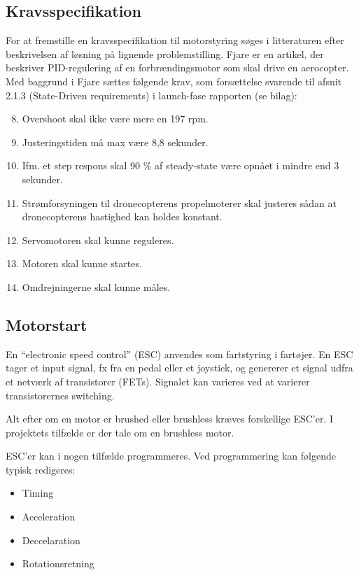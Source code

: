 
\subsection{Kravsspecifikation}
\label{sec:kravsspecifikation}
For at fremstille en kravsspecifikation til motorstyring søges i litteraturen efter beskrivelsen af løsning på lignende problemstilling. Fjare\autocite{pid1} er en artikel, der beskriver PID-regulering af en forbrændingsmotor som skal drive en aerocopter. Med baggrund i Fjare\autocite{pid1} sættes følgende krav, som forsættelse svarende til afsnit 2.1.3 (State-Driven requirements) i launch-fase rapporten (se bilag):
\begin{enumerate}[label=2.1.3.\arabic*]
  \setcounter{enumi}{7}
\item Overshoot skal ikke være mere en 197 rpm.
\item Justeringstiden må max være 8,8 sekunder.
\item Ifm. et step respons skal 90 \% af steady-state være opnået i mindre end 3 sekunder.
\item Strømforsyningen til dronecopterens propelmoterer skal justeres sådan at dronecopterens hastighed kan holdes konstant.%
\item Servomotoren skal kunne reguleres.
\item Motoren skal kunne startes.
\item Omdrejningerne skal kunne måles.
\end{enumerate}

\subsection{Motorstart}
\label{sec:esc}

En ``electronic speed control'' (ESC) anvendes som fartstyring i fartøjer. En ESC tager et input signal, fx fra en pedal eller et joystick, og genererer et signal udfra et netværk af transistorer (FETs). Signalet kan varieres ved at varierer transistorernes switching.

Alt efter om en motor er brushed eller brushless kræves forskellige ESC'er. I projektets tilfælde er der tale om en brushless motor. 

ESC'er kan i nogen tilfælde programmeres. Ved programmering kan følgende typisk redigeres:
\begin{itemize}
\item Timing
\item Acceleration
\item Deccelaration
\item Rotationsretning
\end{itemize}

